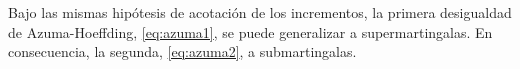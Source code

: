 \begin{observation}
    Bajo las mismas hipótesis de acotación de los incrementos, la primera desigualdad de Azuma-Hoeffding, \eqref{eq:azuma1}, se puede generalizar a supermartingalas.
    En consecuencia, la segunda, \eqref{eq:azuma2}, a submartingalas.
\end{observation}